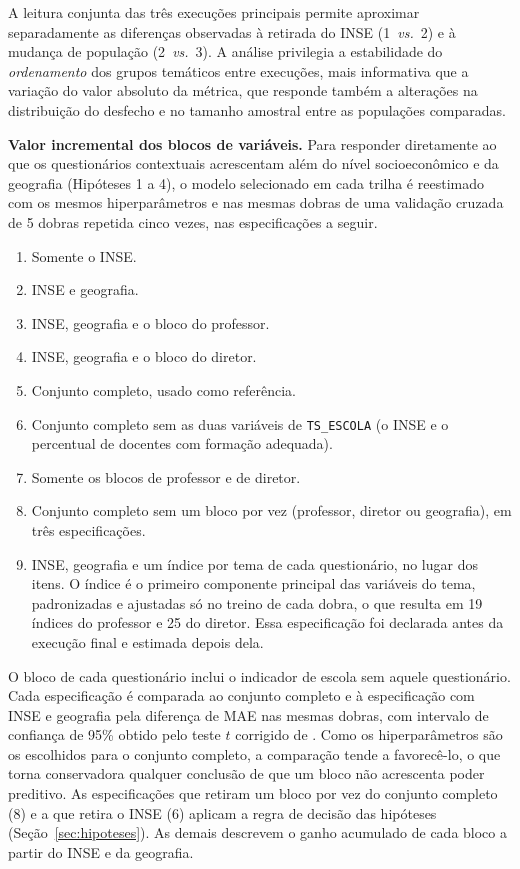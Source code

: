A leitura conjunta das três execuções principais permite aproximar
separadamente as diferenças observadas à retirada do INSE
(1~\textit{vs.}~2) e à mudança de população (2~\textit{vs.}~3). A análise privilegia a estabilidade do
\emph{ordenamento} dos grupos temáticos entre execuções, mais informativa
que a variação do valor absoluto da métrica, que responde também a
alterações na distribuição do desfecho e no tamanho amostral entre as
populações comparadas.

\textbf{Valor incremental dos blocos de variáveis.} Para responder
diretamente ao que os questionários contextuais acrescentam além do nível
socioeconômico e da geografia (Hipóteses 1 a 4), o modelo selecionado em cada
trilha é reestimado com os mesmos hiperparâmetros e nas mesmas dobras de uma
validação cruzada de 5 dobras repetida cinco vezes, nas especificações a
seguir.
\begin{enumerate}
    \item Somente o INSE.
    \item INSE e geografia.
    \item INSE, geografia e o bloco do professor.
    \item INSE, geografia e o bloco do diretor.
    \item Conjunto completo, usado como referência.
    \item Conjunto completo sem as duas variáveis de \texttt{TS\_ESCOLA} (o INSE
    e o percentual de docentes com formação adequada).
    \item Somente os blocos de professor e de diretor.
    \item Conjunto completo sem um bloco por vez (professor, diretor ou
    geografia), em três especificações.
    \item INSE, geografia e um índice por tema de cada questionário, no
    lugar dos itens. O índice é o primeiro componente principal das
    variáveis do tema, padronizadas e ajustadas só no treino de cada dobra,
    o que resulta em 19 índices do professor e 25 do diretor. Essa
    especificação foi declarada antes da execução final e estimada depois
    dela.
\end{enumerate}
O bloco de cada questionário inclui o indicador de escola sem aquele
questionário. Cada especificação é comparada ao conjunto completo e à
especificação com INSE e geografia pela diferença de MAE nas mesmas dobras,
com intervalo de confiança de 95\%
obtido pelo teste $t$ corrigido de . Como os
hiperparâmetros são os escolhidos para o conjunto completo, a comparação
tende a favorecê-lo, o que torna conservadora qualquer conclusão de que um
bloco não acrescenta poder preditivo. As especificações que retiram um bloco
por vez do conjunto completo (8) e a que retira o INSE (6) aplicam a regra de
decisão das hipóteses (Seção~\ref{sec:hipoteses}). As demais descrevem o
ganho acumulado de cada bloco a partir do INSE e da geografia.

